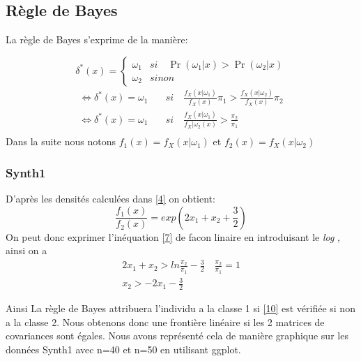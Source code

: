 \documentclass[10pt]{article}
\begin{document}
\subsection{Règle de Bayes}
La règle de Bayes s'exprime de la manière:

\[\delta^{*}(x) = \begin{cases} \omega_{1} & si  \quad \Pr(\omega_{1}|x)>  \Pr(\omega_{2}|x) \\
	\omega_{2} & sinon \end{cases}\]
\begin{equation}
\begin{split}
 \iff \delta^{*}(x) = \omega_{1} \quad & si \quad  \frac{f_{X}(x|\omega_{1})}{f_{X}(x)} \pi_{1}> \frac{f_{X}(x|\omega_{2})}{f_{X}(x)}\pi_{2} \\ 
\iff \delta^{*}(x) = \omega_{1} \quad & si \quad  \frac{f_{X}(x|\omega_{1})}{f_{X}|\omega_{2}(x)} > \frac{\pi_{2}}{\pi_{1}} \\ 
\end{split}
\label{9}
\end{equation}
 Dans la suite nous notons $f_1(x) = f_{X}(x|\omega_{1})$ et $f_2(x) = f_{X}(x|\omega_{2})$

\subsubsection{Synth1}
D'après les densités calculées dans \eqref{4} on obtient: \[\frac{f_{1}(x)}{f_{2}(x)} = exp(2x_{1} + x_{2} + \frac{3}{2})\]
On peut donc exprimer l'inéquation \ref{7} de facon linaire en introduisant le \textit{log} , ainsi on a
\begin{equation}
\begin{split}
2x_{1} + x_{2} > ln\frac{\pi_{2}}{\pi_{1}} - \frac{3}{2}   \quad \frac{\pi_{2}}{\pi_{1}} = 1 \\
x_{2} >  -2x_{1} - \frac{3}{2}
\label{10}
\end{split}
\end{equation}

Ainsi La règle de Bayes attribuera l'individu a la classe 1 si \eqref{10} est vérifiée si non a la classe 2. Nous obtenons donc une frontière linéaire si les 2 matrices de covariances sont égales. Nous avons représenté cela de manière graphique sur les données Synth1 avec n=40 et n=50 en utilisant ggplot.\\
\end{document}
